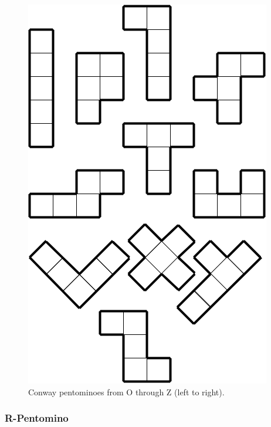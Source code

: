 \begin{figure}[H]
	\centering
	\includegraphics[scale=0.35]{diagrams/conway_pentominoes.PNG}
	\caption{Conway pentominoes from O through Z (left to right).}
  \label{fig:conway_pentominoes}
\end{figure}


\subsubsection{R-Pentomino}
